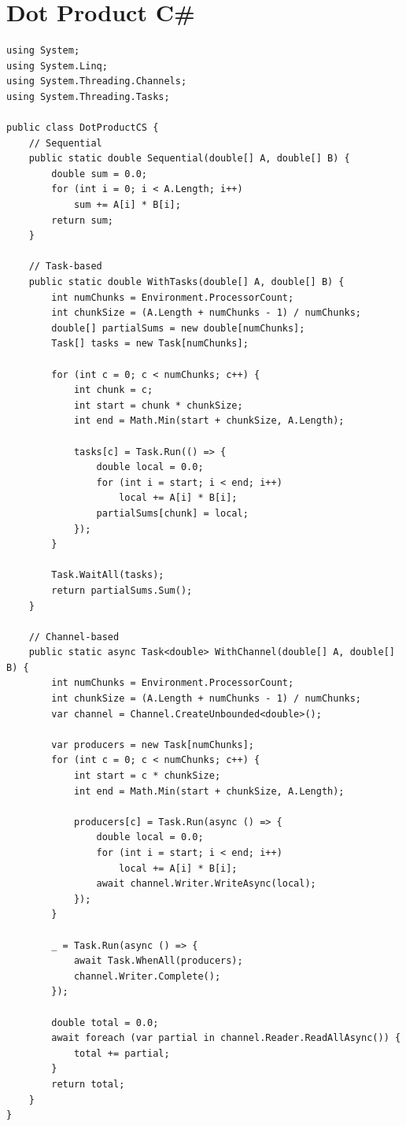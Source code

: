 \section{Dot Product C\#}

\begin{lstlisting}[style=csharpstyle, caption={DotProduct với Task và Channel}]
using System;
using System.Linq;
using System.Threading.Channels;
using System.Threading.Tasks;

public class DotProductCS {
    // Sequential
    public static double Sequential(double[] A, double[] B) {
        double sum = 0.0;
        for (int i = 0; i < A.Length; i++)
            sum += A[i] * B[i];
        return sum;
    }
    
    // Task-based
    public static double WithTasks(double[] A, double[] B) {
        int numChunks = Environment.ProcessorCount;
        int chunkSize = (A.Length + numChunks - 1) / numChunks;
        double[] partialSums = new double[numChunks];
        Task[] tasks = new Task[numChunks];
        
        for (int c = 0; c < numChunks; c++) {
            int chunk = c;
            int start = chunk * chunkSize;
            int end = Math.Min(start + chunkSize, A.Length);
            
            tasks[c] = Task.Run(() => {
                double local = 0.0;
                for (int i = start; i < end; i++)
                    local += A[i] * B[i];
                partialSums[chunk] = local;
            });
        }
        
        Task.WaitAll(tasks);
        return partialSums.Sum();
    }
    
    // Channel-based
    public static async Task<double> WithChannel(double[] A, double[] B) {
        int numChunks = Environment.ProcessorCount;
        int chunkSize = (A.Length + numChunks - 1) / numChunks;
        var channel = Channel.CreateUnbounded<double>();
        
        var producers = new Task[numChunks];
        for (int c = 0; c < numChunks; c++) {
            int start = c * chunkSize;
            int end = Math.Min(start + chunkSize, A.Length);
            
            producers[c] = Task.Run(async () => {
                double local = 0.0;
                for (int i = start; i < end; i++)
                    local += A[i] * B[i];
                await channel.Writer.WriteAsync(local);
            });
        }
        
        _ = Task.Run(async () => {
            await Task.WhenAll(producers);
            channel.Writer.Complete();
        });
        
        double total = 0.0;
        await foreach (var partial in channel.Reader.ReadAllAsync()) {
            total += partial;
        }
        return total;
    }
}
\end{lstlisting}

